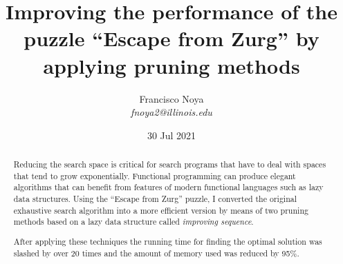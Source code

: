 \documentclass[journal,onecolumn]{IEEEtran}
\begin{document}

\title{Improving the performance of the puzzle ``Escape from Zurg'' by applying pruning methods}
%

%


\author{
%
 Francisco Noya

 \textit{fnoya2@illinois.edu}
}
\date{30 Jul 2021}
\maketitle
\begin{abstract}\normalsize
 Reducing the search space is critical for search programs that have to deal with
 spaces that tend to grow exponentially. Functional programming can produce elegant
 algorithms that can benefit from features of modern functional languages such as
 lazy data structures. Using the ``Escape from Zurg'' puzzle, I converted the original exhaustive
 search algorithm into a more efficient version by means of two pruning methods based on
 a lazy data structure called \textit{improving sequence}.

 After applying these techniques the running time for finding the optimal
 solution was slashed by over 20 times and the amount of memory used was
 reduced by 95\%.
\end{abstract}
\end{document}
